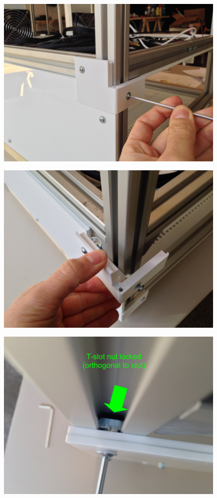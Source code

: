 \begin{figure}[H]
  \centering
  \includegraphics[width=.7\linewidth]{./img/open_electronics_enclosure_-_step4_-_03.png}
\end{figure}

\begin{figure}[H]
  \centering
  \includegraphics[width=.7\linewidth]{./img/open_electronics_enclosure_-_step4_-_04.png}
\end{figure}

\begin{figure}[H]
  \centering
  \includegraphics[width=.7\linewidth]{./img/open_electronics_enclosure_-_step5_-_02.png}
\end{figure}

